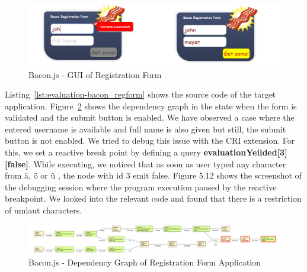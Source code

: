 \begin{figure}[!h]
	\centering
	\includegraphics[width=\textwidth,height=\textheight,keepaspectratio]{gfx/evaluation/bacon_reg_form_ui.png}
	\caption{Bacon.js - GUI of Registration Form}
	\label{fig:bacon_reg_form_ui}
\end{figure}



Listing~\ref{lst:evaluation-bacon_regform} shows the source code of the target application. Figure~\ref{fig:bacon_dg_regform} shows the dependency graph in the state when the form is validated and the submit button is enabled. We have observed a case where the entered username is available and full name is also given but still, the submit button is not enabled. We tried to debug this issue with the CRI extension. For this, we set a reactive break point by defining a query \textbf{evaluationYeilded[3][false]}. While executing, we noticed that as soon as user typed any character from \"a, \"o or \"u , the node with id 3 emit false. Figure 5.12 shows the screenshot of the debugging session where the program execution paused by the reactive breakpoint.  We looked into the relevant code and found that there is a restriction of umlaut characters. 

\begin{figure}[!h]
	\centering
	\includegraphics[width=\textwidth,height=\textheight,keepaspectratio]{gfx/evaluation/bacon_dg_regform.png}
	\caption{Bacon.js - Dependency Graph of Registration Form Application}
	\label{fig:bacon_dg_regform}
\end{figure}

